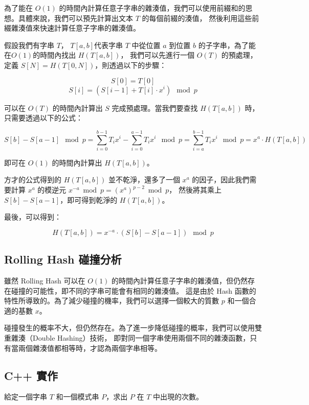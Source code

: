 為了能在 $O(1)$ 的時間內計算任意子字串的雜湊值，我們可以使用前綴和的思想。具體來說，我們可以預先計算出文本 $T$ 的每個前綴的湊值，
然後利用這些前綴雜湊值來快速計算任意子字串的雜湊值。

假設我們有字串 $T$， $T[a, b]$代表字串 $T$ 中從位置 $a$ 到位置 $b$ 的子字串，為了能在$O(1)$的時間內找出 $H(T[a, b])$，
我們可以先進行一個 $O(T)$ 的預處理，定義 $S[N] = H(T[0, N])$，則透過以下的步驟：

$$S[0] = T[0]$$
$$S[i] = (S[i-1] + T[i]\cdot x^i) \mod p$$

可以在 $O(T)$ 的時間內計算出 $S$ 完成預處理。當我們要查找 $H(T[a, b])$ 時，只需要透過以下的公式：

$$S[b] - S[a-1] \mod p = \displaystyle\sum_{i=0}^{b-1}T_ix^i - \displaystyle\sum_{i=0}^{a-1}T_ix^i \mod p = \displaystyle\sum_{i=a}^{b-1}T_ix^i \mod p = x^{a}\cdot H(T[a, b])$$

即可在 $O(1)$ 的時間內計算出 $H(T[a, b])$。

方才的公式得到的 $H(T[a, b])$ 並不乾淨，還多了一個 $x^{a}$ 的因子，因此我們需要計算 $x^{a}$ 的模逆元 $x^{-a} \bmod p = (x^a)^{p-2} \bmod p$，
然後將其乘上 $S[b] - S[a-1]$，即可得到乾淨的 $H(T[a, b])$。

最後，可以得到：

$$H(T[a, b]) = x^{-a} \cdot (S[b] - S[a-1]) \mod p$$


\subsection{Rolling Hash 碰撞分析}

雖然 Rolling Hash 可以在 $O(1)$ 的時間內計算任意子字串的雜湊值，但仍然存在碰撞的可能性，即不同的字串可能會有相同的雜湊值。
這是由於 Hash 函數的特性所導致的。為了減少碰撞的機率，我們可以選擇一個較大的質數 $p$ 和一個合適的基數 $x$。

碰撞發生的概率不大，但仍然存在。為了進一步降低碰撞的概率，我們可以使用雙重雜湊（Double Hashing）技術，
即對同一個字串使用兩個不同的雜湊函數，只有當兩個雜湊值都相等時，才認為兩個字串相等。


\subsection{C++ 實作}

給定一個字串 $T$ 和一個模式串 $P$，求出 $P$ 在 $T$ 中出現的次數。

